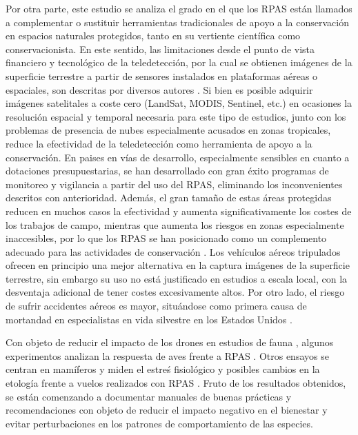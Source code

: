 \documentclass[11pt,]{article}
\begin{document}
Por otra parte, este estudio se analiza el grado en el que los RPAS
están llamados a complementar o sustituir herramientas tradicionales de
apoyo a la conservación en espacios naturales protegidos, tanto en su
vertiente científica como conservacionista. En este sentido, las
limitaciones desde el punto de vista financiero y tecnológico de la
teledetección, por la cual se obtienen imágenes de la superficie
terrestre a partir de sensores instalados en plataformas aéreas o
espaciales, son descritas por diversos autores \citep{Koh2012}. Si bien
es posible adquirir imágenes satelitales a coste cero (LandSat, MODIS,
Sentinel, etc.) en ocasiones la resolución espacial y temporal necesaria
para este tipo de estudios, junto con los problemas de presencia de
nubes especialmente acusados en zonas tropicales, reduce la efectividad
de la teledetección como herramienta de apoyo a la conservación. En
paises en vías de desarrollo, especialmente sensibles en cuanto a
dotaciones presupuestarias, se han desarrollado con gran éxito programas
de monitoreo y vigilancia a partir del uso del RPAS, eliminando los
inconvenientes descritos con anterioridad. Además, el gran tamaño de
estas áreas protegidas reducen en muchos casos la efectividad y aumenta
significativamente los costes de los trabajos de campo, mientras que
aumenta los riesgos en zonas especialmente inaccesibles, por lo que los
RPAS se han posicionado como un complemento adecuado para las
actividades de conservación \citep{Zahawi2015}. Los vehículos aéreos
tripulados ofrecen en principio una mejor alternativa en la captura
imágenes de la superficie terrestre, sin embargo su uso no está
justificado en estudios a escala local, con la desventaja adicional de
tener costes excesivamente altos. Por otro lado, el riesgo de sufrir
accidentes aéreos es mayor, situándose como primera causa de mortandad
en especialistas en vida silvestre en los Estados Unidos
\citep{Sasse2003}.

Con objeto de reducir el impacto de los drones en estudios de fauna ,
algunos experimentos analizan la respuesta de aves frente a RPAS
\citep{Vas2015}. Otros ensayos se centran en mamíferos y miden el estreś
fisiológico y posibles cambios en la etología frente a vuelos realizados
con RPAS \citep{Ditmer2015}. Fruto de los resultados obtenidos, se están
comenzando a documentar manuales de buenas prácticas y recomendaciones
con objeto de reducir el impacto negativo en el bienestar y evitar
perturbaciones en los patrones de comportamiento de las especies.
\end{document}
